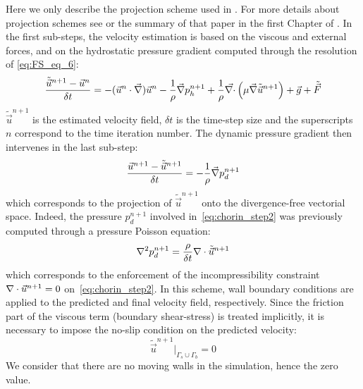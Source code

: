 Here we only describe the projection scheme used in .
For more details about projection schemes see \cite{Guermond2006} or the summary of that paper in the first Chapter of \cite{Leroy2014}.
In the first sub-steps, the velocity estimation is based on the viscous and external forces, and on the hydrostatic pressure gradient computed through the resolution of \eqref{eq:FS_eq_6}:
\begin{equation}\label{eq:chorin_step1}
  \displaystyle{\dfrac{\tilde{\vec{u}}^{n+1}-\vec{u}^n}{\delta t}}= - (\vec{u}^n \cdot \vec \nabla) \vec{u}^n -\dfrac{1}{\rho} \vec \nabla p_h^{n+1}
  + \dfrac{1}{\rho} \vec{\nabla \cdot} \left(\mu \vec \nabla \tilde{\vec{u}}^{n+1} \right)+ \vec{g} + \tilde{\vec{F}}\\
\end{equation}
$\tilde{\vec{u}}^{n+1}$ is the estimated velocity field, $\delta t$ is the time-step size and the superscripts $n$ correspond to the time iteration number.
The dynamic pressure gradient then intervenes in the last sub-step:
\begin{equation}\label{eq:chorin_step2}
  \displaystyle{\dfrac{\vec{u}^{n+1}-\tilde{\vec{u}}^{n+1}}{\delta t}}=-\dfrac{1}{\rho} \vec \nabla p_d^{n+1}
\end{equation}
which corresponds to the projection of $\tilde{\vec{u}}^{n+1}$ onto the divergence-free vectorial space.
Indeed, the pressure $p_d^{n+1}$ involved in~\eqref{eq:chorin_step2} was previously computed through a pressure Poisson equation:
\begin{equation}
  \label{eq:poisson}
  \nabla^2 p_d^{n+1}=\dfrac{\rho}{\delta t}\nabla \cdot \tilde{\vec{u}}^{n+1}
\end{equation}
which corresponds to the enforcement of the incompressibility constraint \mbox{$\nabla \cdot \vec{u}^{n+1}=0 $} on~\eqref{eq:chorin_step2}.
In this scheme, wall boundary conditions are applied to the predicted and final velocity field, respectively.
Since the friction part of the viscous term (boundary shear-stress) is treated implicitly, it is necessary to impose the
no-slip condition on the predicted velocity:
\begin{equation}\label{eq:ChorinBCs}
      \tilde{\vec{u}}^{n+1}|_{\Gamma_s\cup\Gamma_b} = 0
\end{equation}
We consider that there are no moving walls in the simulation, hence the zero value.

